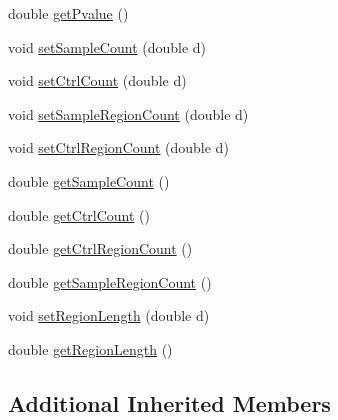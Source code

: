 \begin{DoxyCompactItemize}
\item 
double \hyperlink{classumms_1_1core_1_1model_1_1score_1_1_binomial_enrichment_score_a61dd9a809363a54c793a85de1aeae4f7}{get\+Pvalue} ()
\item 
void \hyperlink{classumms_1_1core_1_1model_1_1score_1_1_binomial_enrichment_score_ae7ed1a7329037df5041ff3594446a5c0}{set\+Sample\+Count} (double d)
\item 
void \hyperlink{classumms_1_1core_1_1model_1_1score_1_1_binomial_enrichment_score_af27e39aa46a85ed391bfc2a0638c1eeb}{set\+Ctrl\+Count} (double d)
\item 
void \hyperlink{classumms_1_1core_1_1model_1_1score_1_1_binomial_enrichment_score_a76b7022678c5d0c0b48f38cf7e7154a8}{set\+Sample\+Region\+Count} (double d)
\item 
void \hyperlink{classumms_1_1core_1_1model_1_1score_1_1_binomial_enrichment_score_a00be31dfd637d3ea6e407f20524db0ac}{set\+Ctrl\+Region\+Count} (double d)
\item 
double \hyperlink{classumms_1_1core_1_1model_1_1score_1_1_binomial_enrichment_score_adbd5e9efd8b56ad20b551e68da1f9bd5}{get\+Sample\+Count} ()
\item 
double \hyperlink{classumms_1_1core_1_1model_1_1score_1_1_binomial_enrichment_score_ab288a6522eaff92e133e19ee8f369135}{get\+Ctrl\+Count} ()
\item 
double \hyperlink{classumms_1_1core_1_1model_1_1score_1_1_binomial_enrichment_score_ac1e19e31d05cb7a9790e5916b59fb932}{get\+Ctrl\+Region\+Count} ()
\item 
double \hyperlink{classumms_1_1core_1_1model_1_1score_1_1_binomial_enrichment_score_a74d614de501b2811ae0eb9b966837db1}{get\+Sample\+Region\+Count} ()
\item 
void \hyperlink{classumms_1_1core_1_1model_1_1score_1_1_binomial_enrichment_score_abda24560294c8a6578c8b59ec879790d}{set\+Region\+Length} (double d)
\item 
double \hyperlink{classumms_1_1core_1_1model_1_1score_1_1_binomial_enrichment_score_af5a279f23479b5f987ccf67f5f40bd13}{get\+Region\+Length} ()
\end{DoxyCompactItemize}
\subsection*{Additional Inherited Members}


